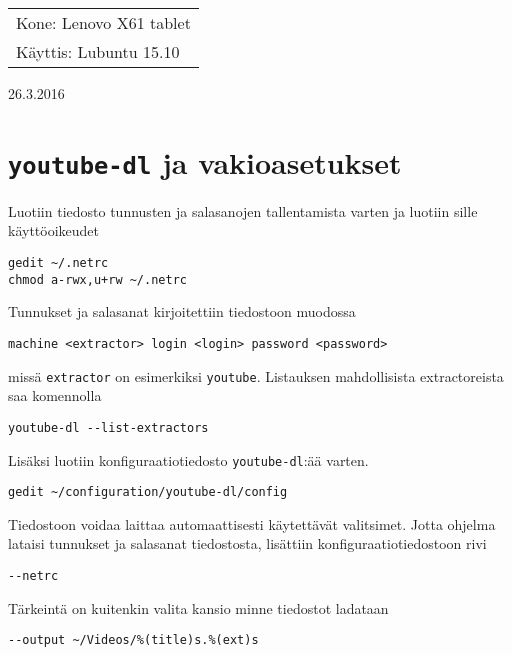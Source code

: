 \documentclass[main.tex]{subfiles}
\begin{document}
\thispagestyle{empty}
\begin{tabular}[t]{l}
Kone: Lenovo X61 tablet\\
Käyttis: Lubuntu 15.10
\end{tabular}
\hfill 26.3.2016

{\section{\texttt{youtube-dl} ja vakioasetukset}}

Luotiin tiedosto tunnusten ja salasanojen tallentamista varten ja luotiin sille käyttöoikeudet

\begin{lstlisting}
gedit ~/.netrc
chmod a-rwx,u+rw ~/.netrc
\end{lstlisting}

Tunnukset ja salasanat kirjoitettiin tiedostoon muodossa

\begin{lstlisting}
machine <extractor> login <login> password <password>
\end{lstlisting}

missä \texttt{extractor} on esimerkiksi \texttt{youtube}. Listauksen mahdollisista extractoreista saa komennolla

\begin{lstlisting}
youtube-dl --list-extractors
\end{lstlisting}

Lisäksi luotiin konfiguraatiotiedosto \texttt{youtube-dl}:ää varten.

\begin{lstlisting}
gedit ~/configuration/youtube-dl/config
\end{lstlisting}

Tiedostoon voidaa laittaa automaattisesti käytettävät valitsimet. Jotta ohjelma lataisi tunnukset ja salasanat tiedostosta, lisättiin konfiguraatiotiedostoon rivi

\begin{lstlisting}
--netrc
\end{lstlisting}

Tärkeintä on kuitenkin valita kansio minne tiedostot ladataan

\begin{lstlisting}
--output ~/Videos/%(title)s.%(ext)s
\end{lstlisting}
\end{document}
